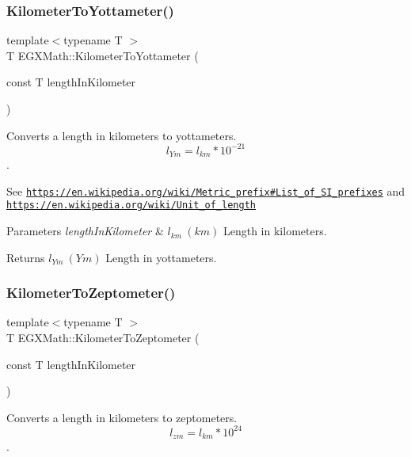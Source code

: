 \subsubsection{\texorpdfstring{Kilometer\+To\+Yottameter()}{KilometerToYottameter()}}
{\footnotesize\ttfamily template$<$typename T $>$ \\
T E\+G\+X\+Math\+::\+Kilometer\+To\+Yottameter (\begin{DoxyParamCaption}\item[{const T}]{length\+In\+Kilometer }\end{DoxyParamCaption})}



Converts a length in kilometers to yottameters. \[ l_{Ym}=l_{km} * 10^{-21} \]. 

See \href{https://en.wikipedia.org/wiki/Metric_prefix#List_of_SI_prefixes}{\tt https\+://en.\+wikipedia.\+org/wiki/\+Metric\+\_\+prefix\#\+List\+\_\+of\+\_\+\+S\+I\+\_\+prefixes} and \href{https://en.wikipedia.org/wiki/Unit_of_length}{\tt https\+://en.\+wikipedia.\+org/wiki/\+Unit\+\_\+of\+\_\+length} 
\begin{DoxyParams}{Parameters}
{\em length\+In\+Kilometer} & $ l_{km}\ (km)$ Length in kilometers. \\
\hline
\end{DoxyParams}
\begin{DoxyReturn}{Returns}
$ l_{Ym}\ (Ym)$ Length in yottameters. 
\end{DoxyReturn}
\mbox{\label{group___e_g_x_math-_conversions-_length_conversions-_kilometer-_s_i_ga377d2c4ad2db833c5a7c16861600da49}} 
\subsubsection{\texorpdfstring{Kilometer\+To\+Zeptometer()}{KilometerToZeptometer()}}
{\footnotesize\ttfamily template$<$typename T $>$ \\
T E\+G\+X\+Math\+::\+Kilometer\+To\+Zeptometer (\begin{DoxyParamCaption}\item[{const T}]{length\+In\+Kilometer }\end{DoxyParamCaption})}



Converts a length in kilometers to zeptometers. \[ l_{zm}=l_{km} * 10^{24} \]. 

